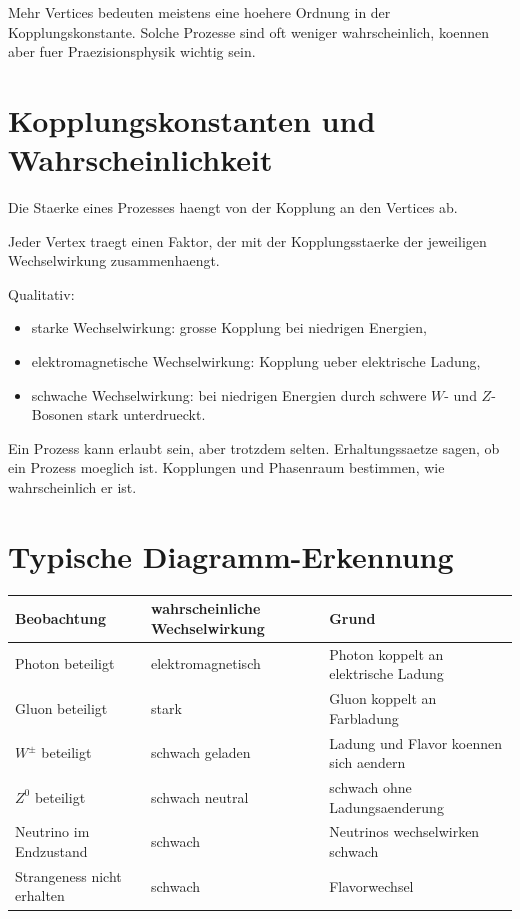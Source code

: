 \begin{examtipbox}
Mehr Vertices bedeuten meistens eine hoehere Ordnung in der Kopplungskonstante.
Solche Prozesse sind oft weniger wahrscheinlich, koennen aber fuer Praezisionsphysik
wichtig sein.
\end{examtipbox}

\section{Kopplungskonstanten und Wahrscheinlichkeit}

Die Staerke eines Prozesses haengt von der Kopplung an den Vertices ab.

\begin{conceptbox}
Jeder Vertex traegt einen Faktor, der mit der Kopplungsstaerke der jeweiligen
Wechselwirkung zusammenhaengt.

Qualitativ:
\begin{itemize}
    \item starke Wechselwirkung: grosse Kopplung bei niedrigen Energien,
    \item elektromagnetische Wechselwirkung: Kopplung ueber elektrische Ladung,
    \item schwache Wechselwirkung: bei niedrigen Energien durch schwere $W$- und
    $Z$-Bosonen stark unterdrueckt.
\end{itemize}
\end{conceptbox}

\begin{examtipbox}
Ein Prozess kann erlaubt sein, aber trotzdem selten.
Erhaltungssaetze sagen, ob ein Prozess moeglich ist.
Kopplungen und Phasenraum bestimmen, wie wahrscheinlich er ist.
\end{examtipbox}

\section{Typische Diagramm-Erkennung}

\begin{center}
\begin{tabular}{|p{4.0cm}|p{5.0cm}|p{5.0cm}|}
\hline
Beobachtung & wahrscheinliche Wechselwirkung & Grund \\
\hline
Photon beteiligt & elektromagnetisch & Photon koppelt an elektrische Ladung \\
\hline
Gluon beteiligt & stark & Gluon koppelt an Farbladung \\
\hline
$W^\pm$ beteiligt & schwach geladen & Ladung und Flavor koennen sich aendern \\
\hline
$Z^0$ beteiligt & schwach neutral & schwach ohne Ladungsaenderung \\
\hline
Neutrino im Endzustand & schwach & Neutrinos wechselwirken schwach \\
\hline
Strangeness nicht erhalten & schwach & Flavorwechsel \\
\hline
\end{tabular}
\end{center}

